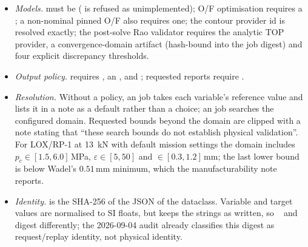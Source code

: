 \begin{itemize}
  \item \emph{Models.}  must be  ( is refused as unimplemented); O/F optimisation requires a ; a non-nominal pinned O/F also requires one; the contour provider id is resolved exactly; the post-solve Rao validator requires the analytic TOP provider, a convergence-domain artifact (hash-bound into the job digest) and four explicit discrepancy thresholds.
  \item \emph{Output policy.}  requires , an , and ; requested reports require .
  \item \emph{Resolution.} Without a policy, an  job takes each variable's reference value and lists it in a note as a default rather than a choice; an  job searches the configured domain. Requested bounds beyond the domain are clipped with a note stating that ``these search bounds do not establish physical validation''. For LOX/RP-1 at 13~kN with default mission settings the domain includes $p_c \in [1.5, 6.0]\,$MPa, $\varepsilon \in [5, 50]$ and  $\in [0.3, 1.2]\,$mm; the last lower bound is below Wadel's $0.51\,$mm minimum, which the manufacturability note reports.
  \item \emph{Identity.}  is the SHA-256 of the JSON of the dataclass. Variable and target values are normalised to SI floats, but  keeps the strings as written, so ~ and ~ digest differently; the 2026-09-04 audit already classifies this digest as request/replay identity, not physical identity.
\end{itemize}

